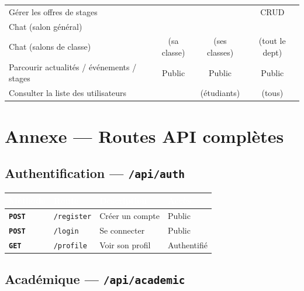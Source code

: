 \documentclass[12pt,a4paper]{article}
\newcommand{\route}[1]{\texorpdfstring{\texttt{\small\color{routeGray}#1}}{#1}}
\newcommand{\httpmethod}[1]{%
  \ifstrequal{#1}{GET}{\colorbox{blue!15}{\texttt{\bfseries\color{blue!70!black}GET}}}{}%
  \ifstrequal{#1}{POST}{\colorbox{green!18}{\texttt{\bfseries\color{green!60!black}POST}}}{}%
  \ifstrequal{#1}{PUT}{\colorbox{orange!18}{\texttt{\bfseries\color{orange!70!black}PUT}}}{}%
  \ifstrequal{#1}{DELETE}{\colorbox{red!15}{\texttt{\bfseries\color{red!70!black}DELETE}}}{}%
}
\newcommand{\cmark}{\textcolor{teacherGreen}{\ding{51}}}
\newcommand{\xmark}{\textcolor{red}{\ding{55}}}
\begin{document}
\begin{center}
\begin{tabular}{>{\raggedright\arraybackslash}p{5.5cm}ccc}
  Gérer les offres de stages & \xmark & \xmark & \cmark\; \footnotesize{CRUD} \\
  Chat (salon général) & \cmark & \cmark & \cmark \\
  Chat (salons de classe) & \cmark\; \footnotesize{(sa classe)} & \cmark\; \footnotesize{(ses classes)} & \cmark\; \footnotesize{(tout le dept)} \\
  Parcourir actualités / événements / stages & \cmark\; \footnotesize{Public} & \cmark\; \footnotesize{Public} & \cmark\; \footnotesize{Public} \\
  Consulter la liste des utilisateurs & \xmark & \cmark\; \footnotesize{(étudiants)} & \cmark\; \footnotesize{(tous)} \\
  \bottomrule
\end{tabular}
\end{center}

\newpage

\section{Annexe — Routes API complètes}

\subsection{Authentification — \route{/api/auth}}

\begin{center}
\begin{tabular}{|l|l|p{6cm}|l|}
  \hline
  \rowcolor{headerBg}
  \textcolor{white}{\textbf{Méthode}} & \textcolor{white}{\textbf{Route}} & \textcolor{white}{\textbf{Description}} & \textcolor{white}{\textbf{Accès}} \\
  \hline
  \httpmethod{POST} & \texttt{/register} & Créer un compte & Public \\
  \httpmethod{POST} & \texttt{/login} & Se connecter & Public \\
  \httpmethod{GET}  & \texttt{/profile} & Voir son profil & Authentifié \\
  \hline
\end{tabular}
\end{center}

\subsection{Académique — \route{/api/academic}}
\end{document}
